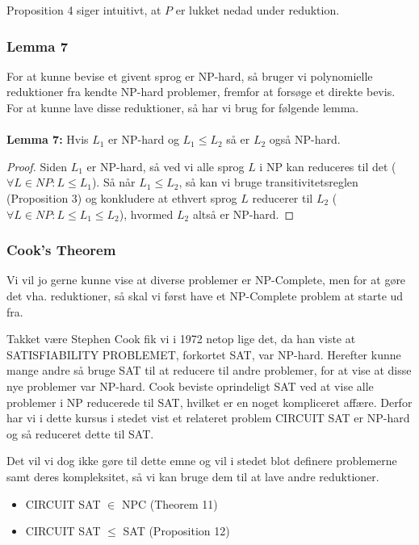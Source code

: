 Proposition 4 siger intuitivt, at $P$ er lukket nedad under reduktion. 
\subsubsection{Lemma 7}

For at kunne bevise et givent sprog er NP-hard, så bruger vi  polynomielle reduktioner fra kendte NP-hard problemer, fremfor at forsøge et direkte bevis. For at kunne lave disse reduktioner, så har vi brug for følgende lemma.\\
~\\
\textbf{Lemma 7:} Hvis $L_1$ er NP-hard og $L_1 \leq L_2$ så er $L_2$ også NP-hard.

\begin{proof}
 Siden $L_1$ er NP-hard, så ved vi alle sprog $L$ i NP kan reduceres til det ($\forall L \in NP: L \leq L_1$). Så når $L_1 \leq L_2$, så kan vi bruge transitivitetsreglen (Proposition 3) og konkludere at ethvert sprog $L$ reducerer til $L_2$ ($\forall L \in NP: L \leq L_1 \leq L_2$), hvormed $L_2$ altså er NP-hard.
\end{proof}


\subsubsection{Cook's Theorem}

Vi vil jo gerne kunne vise at diverse problemer er NP-Complete, men for at gøre det vha. reduktioner, så skal vi først have et NP-Complete problem at starte ud fra.

Takket være Stephen Cook fik vi i 1972 netop lige det, da han viste at SATISFIABILITY PROBLEMET, forkortet SAT, var NP-hard. Herefter kunne mange andre så bruge SAT til at reducere til andre problemer, for at vise at disse nye problemer var NP-hard. Cook beviste oprindeligt SAT ved at vise alle problemer i NP reducerede til SAT, hvilket er en noget kompliceret affære. Derfor har vi i dette kursus i stedet vist et relateret problem CIRCUIT SAT er NP-hard og så reduceret dette til SAT.

Det vil vi dog ikke gøre til dette emne og vil i stedet blot definere problemerne samt deres kompleksitet, så vi kan bruge dem til at lave andre reduktioner.

\begin{itemize}
 \item CIRCUIT SAT $\in$ NPC (Theorem 11)
 \item CIRCUIT SAT $\leq$ SAT (Proposition 12)
\end{itemize}

